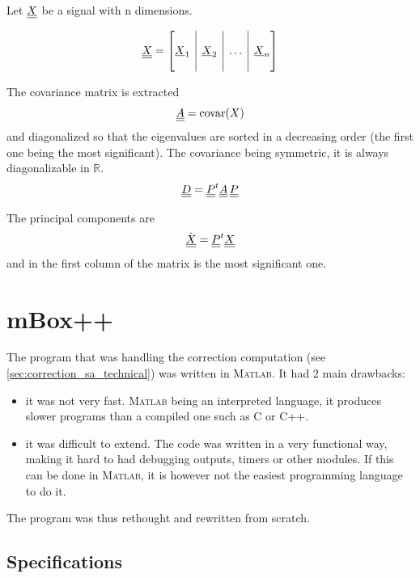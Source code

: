 Let $\underline{\underline{X}}$ be a signal with n dimensions.

\begin{equation}
\mat{X} = \left[
\begin{array}{@{}c|c|c|c@{}}
&&&\\ \vec{X}_1 & \vec{X}_2 & \dots & \vec{X}_n \\ &&&
\end{array}
\right]
\end{equation}

The covariance matrix is extracted
\begin{equation}
\underline{\underline{A}} = \text{covar}(X)
\end{equation}
and diagonalized so that the eigenvalues are sorted in a decreasing order (the first one being the most significant). The covariance being symmetric, it is always diagonalizable in $\mathbb{R}$.
\begin{equation}
\underline{\underline{D}} = \underline{\underline{P}}^{t} \underline{\underline{A}} \, \underline{\underline{P}}
\end{equation}

The principal components are
\begin{equation}
\hat{\underline{\underline{X}}} = \underline{\underline{P}}^{t} \underline{\underline{X}}
\end{equation}
and in the first column of the matrix is the most significant one.

\chapter{mBox++}
The program that was handling the correction computation (see \cref{sec:correction_sa_technical}) was written in \textsc{Matlab}. It had 2 main drawbacks:
\begin{itemize}
    \item it was not very fast. \textsc{Matlab} being an interpreted language, it produces slower programs than a compiled one such as C or C++.
    \item it was difficult to extend. The code was written in a very functional way, making it hard to had debugging outputs, timers or other modules. If this can be done in \textsc{Matlab}, it is however not the easiest programming language to do it.
\end{itemize}

The program was thus rethought and rewritten from scratch.

\section{Specifications}

